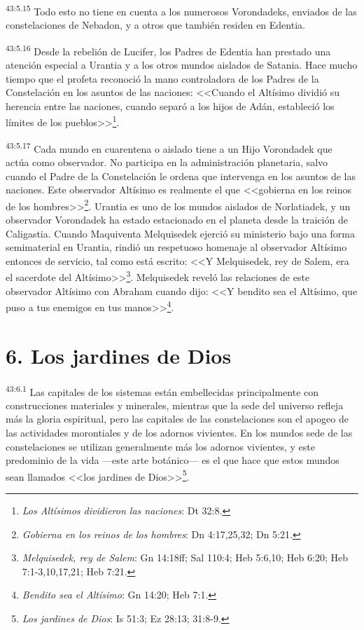 \par
\textsuperscript{43:5.15} Todo esto no tiene en cuenta a los numerosos Vorondadeks, enviados de las constelaciones de Nebadon, y a otros que también residen en Edentia.

\par
\textsuperscript{43:5.16} Desde la rebelión de Lucifer, los Padres de Edentia han prestado una atención especial a Urantia y a los otros mundos aislados de Satania. Hace mucho tiempo que el profeta reconoció la mano controladora de los Padres de la Constelación en los asuntos de las naciones: <<Cuando el Altísimo dividió su herencia entre las naciones, cuando separó a los hijos de Adán, estableció los límites de los pueblos>>\footnote{\textit{Los Altísimos dividieron las naciones}: Dt 32:8.}.

\par
\textsuperscript{43:5.17} Cada mundo en cuarentena o aislado tiene a un Hijo Vorondadek que actúa como observador. No participa en la administración planetaria, salvo cuando el Padre de la Constelación le ordena que intervenga en los asuntos de las naciones. Este observador Altísimo es realmente el que <<gobierna en los reinos de los hombres>>\footnote{\textit{Gobierna en los reinos de los hombres}: Dn 4:17,25,32; Dn 5:21.}. Urantia es uno de los mundos aislados de Norlatiadek, y un observador Vorondadek ha estado estacionado en el planeta desde la traición de Caligastia. Cuando Maquiventa Melquisedek ejerció su ministerio bajo una forma semimaterial en Urantia, rindió un respetuoso homenaje al observador Altísimo entonces de servicio, tal como está escrito: <<Y Melquisedek, rey de Salem, era el sacerdote del Altísimo>>\footnote{\textit{Melquisedek, rey de Salem}: Gn 14:18ff; Sal 110:4; Heb 5:6,10; Heb 6:20; Heb 7:1-3,10,17,21; Heb 7:21.}. Melquisedek reveló las relaciones de este observador Altísimo con Abraham cuando dijo: <<Y bendito sea el Altísimo, que puso a tus enemigos en tus manos>>\footnote{\textit{Bendito sea el Altísimo}: Gn 14:20; Heb 7:1.}.

\section*{6. Los jardines de Dios}
\par
\textsuperscript{43:6.1} Las capitales de los sistemas están embellecidas principalmente con construcciones materiales y minerales, mientras que la sede del universo refleja más la gloria espiritual, pero las capitales de las constelaciones son el apogeo de las actividades morontiales y de los adornos vivientes. En los mundos sede de las constelaciones se utilizan generalmente más los adornos vivientes, y este predominio de la vida ---este arte botánico--- es el que hace que estos mundos sean llamados <<los jardines de Dios>>\footnote{\textit{Los jardines de Dios}: Is 51:3; Ez 28:13; 31:8-9.}.

